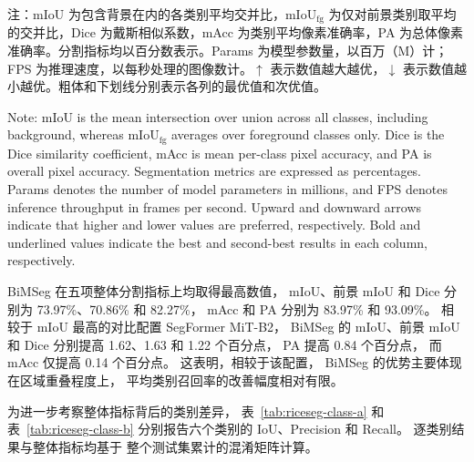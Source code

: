 \begin{table}[!htb]
  \noindent\begin{minipage}{\linewidth}
    \normalfont{}\raggedright
    \noindent 注：mIoU 为包含背景在内的各类别平均交并比，\(\mathrm{mIoU}_{\mathrm{fg}}\) 为仅对前景类别取平均的交并比，Dice 为戴斯相似系数，mAcc 为类别平均像素准确率，PA 为总体像素准确率。分割指标均以百分数表示。Params 为模型参数量，以百万（M）计；FPS 为推理速度，以每秒处理的图像数计。\(\uparrow\) 表示数值越大越优，\(\downarrow\) 表示数值越小越优。粗体和下划线分别表示各列的最优值和次优值。\par
    \vspace{2pt}
    \noindent Note: mIoU is the mean intersection over union across all classes, including background, whereas \(\mathrm{mIoU}_{\mathrm{fg}}\) averages over foreground classes only. Dice is the Dice similarity coefficient, mAcc is mean per-class pixel accuracy, and PA is overall pixel accuracy. Segmentation metrics are expressed as percentages. Params denotes the number of model parameters in millions, and FPS denotes inference throughput in frames per second. Upward and downward arrows indicate that higher and lower values are preferred, respectively. Bold and underlined values indicate the best and second-best results in each column, respectively.\par
  \end{minipage}\par
\end{table}

BiMSeg 在五项整体分割指标上均取得最高数值，
mIoU、前景 mIoU 和 Dice 分别为
73.97\%、70.86\% 和 82.27\%，
mAcc 和 PA 分别为 83.97\% 和 93.09\%。
相较于 mIoU 最高的对比配置 SegFormer MiT-B2，
BiMSeg 的 mIoU、前景 mIoU 和 Dice
分别提高 1.62、1.63 和 1.22 个百分点，
PA 提高 0.84 个百分点，
而 mAcc 仅提高 0.14 个百分点。
这表明，相较于该配置，
BiMSeg 的优势主要体现在区域重叠程度上，
平均类别召回率的改善幅度相对有限。

为进一步考察整体指标背后的类别差异，
表~\ref{tab:riceseg-class-a} 和
表~\ref{tab:riceseg-class-b}
分别报告六个类别的 IoU、Precision 和 Recall。
逐类别结果与整体指标均基于
整个测试集累计的混淆矩阵计算。

